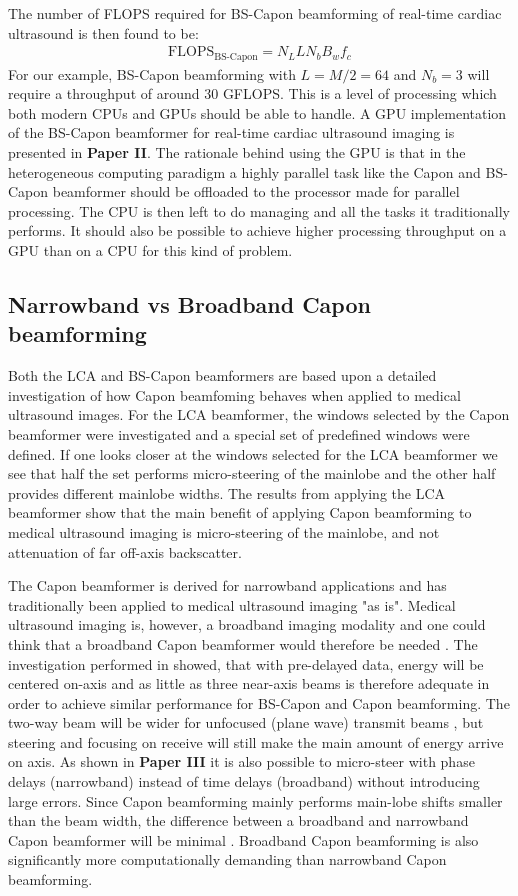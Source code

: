 The number of FLOPS required for BS-Capon beamforming of real-time cardiac ultrasound is then found to be:
\begin{align}
\text{FLOPS}_{\text{BS-Capon}} = N_LLN_bB_wf_c
\end{align}
For our example, BS-Capon beamforming with $L=M/2=64$ and $N_b=3$ will require a throughput of around $30$ GFLOPS. This is a level of processing which both modern CPUs and GPUs should be able to handle. A GPU implementation of the BS-Capon beamformer for real-time cardiac ultrasound imaging is presented in \textbf{Paper II}. The rationale behind using the GPU is that in the heterogeneous computing paradigm a highly parallel task like the Capon and BS-Capon beamformer should be offloaded to the processor made for parallel processing. The CPU is then left to do managing and all the tasks it traditionally performs. It should also be possible to achieve higher processing throughput on a GPU than on a CPU for this kind of problem.

\subsection{Narrowband vs Broadband Capon beamforming}
Both the LCA and BS-Capon beamformers are based upon a detailed investigation of how Capon beamfoming behaves when applied to medical ultrasound images. For the LCA beamformer, the windows selected by the Capon beamformer were investigated and a special set of predefined windows were defined. If one looks closer at the windows selected for the LCA beamformer we see that half the set performs micro-steering of the mainlobe and the other half provides different mainlobe widths. The results from applying the LCA beamformer show that the main benefit of applying Capon beamforming to medical ultrasound imaging is micro-steering of the mainlobe, and not attenuation of far off-axis backscatter.

The Capon beamformer is derived for narrowband applications and has traditionally been applied to medical ultrasound imaging "as is". Medical ultrasound imaging is, however, a broadband imaging modality and one could think that a broadband Capon beamformer would therefore be needed \cite{Holfort2009}. The investigation performed in \cite{Nilsen2009} showed, that with pre-delayed data, energy will be centered on-axis and as little as three near-axis beams is therefore adequate in order to achieve similar performance for BS-Capon and Capon beamforming. The two-way beam will be wider for unfocused (plane wave) transmit beams \cite{Holfort2009, Austeng2011}, but steering and focusing on receive will still make the main amount of energy arrive on axis. As shown in \textbf{Paper III} it is also possible to micro-steer with phase delays (narrowband) instead of time delays (broadband) without introducing large errors. Since Capon beamforming mainly performs main-lobe shifts smaller than the beam width, the difference between a broadband and narrowband Capon beamformer will be minimal \cite{Diamantis2014}. Broadband Capon beamforming is also significantly more computationally demanding than narrowband Capon beamforming.

